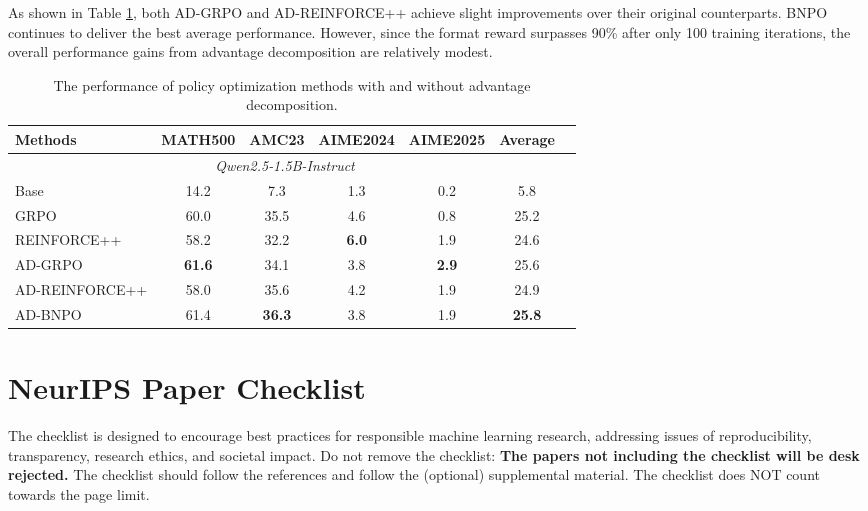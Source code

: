 \documentclass{article}
\theoremstyle{plain}
\theoremstyle{definition}
\theoremstyle{remark}
\begin{document}
As shown in Table \ref{table:2}, both AD-GRPO and AD-REINFORCE++ achieve slight improvements over their original counterparts. BNPO continues to deliver the best average performance. However, since the format reward surpasses 90\% after only 100 training iterations, the overall performance gains from advantage decomposition are relatively modest.


\begin{table}[h]
    \centering
    \caption{The performance of policy optimization methods with and without advantage decomposition. }
    \label{table:2}
    \begin{tabular}{lcccccc}
        \toprule
        \textbf{Methods} & \textbf{MATH500} & \textbf{AMC23} & \textbf{AIME2024} & \textbf{AIME2025} & \textbf{Average}\\
        \midrule
        \multicolumn{6}{c}{\textit{Qwen2.5‑1.5B-Instruct}} \\
        \midrule
        Base                                    & 14.2 & 7.3 & 1.3  & 0.2  &5.8 \\
        GRPO                                    & 60.0 & 35.5 &  4.6  & 0.8  &25.2 \\
        REINFORCE++                             & 58.2 & 32.2 & \textbf{6.0}  & 1.9  &24.6 \\
        \midrule
        AD-GRPO                                 &  \textbf{61.6} & 34.1 & 3.8  &  \textbf{2.9}  &25.6 \\
        AD-REINFORCE++                          & 58.0 & 35.6 & 4.2  & 1.9  &24.9 \\
        AD-BNPO                                 & 61.4 & \textbf{36.3} & 3.8   & 1.9  & \textbf{25.8} \\
        \bottomrule
    \end{tabular}
\end{table}

\iffalse


\newpage
\section*{NeurIPS Paper Checklist}

The checklist is designed to encourage best practices for responsible machine learning research, addressing issues of reproducibility, transparency, research ethics, and societal impact. Do not remove the checklist: {\bf The papers not including the checklist will be desk rejected.} The checklist should follow the references and follow the (optional) supplemental material.  The checklist does NOT count towards the page
limit. 
\end{document}
